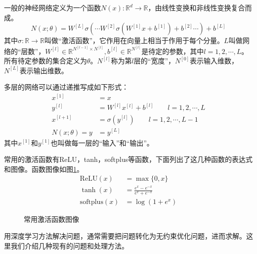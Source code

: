 


一般的神经网络定义为一个函数$N(x): \mathbb{R}^d \rightarrow \mathbb{R}$，由线性变换和非线性变换复合而成。
\begin{equation}\label{nnet}
N(x; \theta) = W^{[L]} \sigma( \cdots W^{[2]} \sigma(W^{[1]} x + b^{[1]}) + b^{[2]} \cdots ) + b^{[L]}
\end{equation}
其中$\sigma: \mathbb{R} \rightarrow \mathbb{R}$叫做“激活函数”，它作用在向量上相当于作用于每个分量。$L$叫做网络的“层数”，$ W^{[l]} \in \mathbb{R}^{N^{[l-1]} \times N^{[l]}}, b^{[l]} \in \mathbb{R}^{N^{[l]}}$是待定的参数，其中$l = 1, 2, \cdots, L$。所有待定参数的集合定义为$\theta$。$N^{[l]}$称为第$l$层的“宽度”，$N^{[0]}$表示输入维数，$N^{[L]}$表示输出维数。

多层的网络可以通过递推写成如下形式：
\begin{equation}
\begin{split}
x^{[1]} & = x \\
y^{[l]} & = W^{[l]} x^{[l]} + b^{[l]} \qquad l = 1, 2, \cdots, L \\
x^{[l+1]} & = \sigma(y^{[l]}) \qquad l = 1, 2, \cdots, L-1 \\
N(x; \theta) = y & = y^{[L]}
\end{split}
\end{equation}
其中$x^{[1]}$和$y^{[1]}$也叫做每一层的“输入”和“输出”。

常用的激活函数有ReLU，tanh，softplus等函数，下面列出了这几种函数的表达式和图像。函数图像如图\ref{fig1-0}。
\begin{equation}
\begin{split}
\mathrm{ReLU}(x) & = \max\{0, x\} \\
\tanh(x) & = \frac{e^{x} - e^{-x}}{e^{x} + e^{-x}} \\
\mathrm{softplus}(x) & = \log(1 + e^{x})
\end{split}
\end{equation}

\begin{figure}[htbp]
\centering
{}
\caption{常用激活函数图像}
\label{fig1-0}
\end{figure}


用深度学习方法解决问题，通常需要把问题转化为无约束优化问题，进而求解。这里我们介绍几种现有的问题和处理方法。

